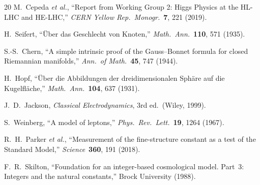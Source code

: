 \documentclass[11pt,a4paper]{article}
\begin{document}
\begin{thebibliography}{20}
M.~Cepeda \emph{et al.},
``Report from Working Group 2: Higgs Physics at the HL-LHC and HE-LHC,''
\emph{CERN Yellow Rep.\ Monogr.}\ \textbf{7}, 221 (2019).

H.~Seifert,
``\"Uber das Geschlecht von Knoten,''
\emph{Math.\ Ann.}\ \textbf{110}, 571 (1935).

S.-S.~Chern,
``A simple intrinsic proof of the Gauss--Bonnet formula for closed Riemannian manifolds,''
\emph{Ann.\ of Math.}\ \textbf{45}, 747 (1944).

H.~Hopf,
``\"Uber die Abbildungen der dreidimensionalen Sph\"are auf die Kugelfl\"ache,''
\emph{Math.\ Ann.}\ \textbf{104}, 637 (1931).

J.~D.~Jackson,
\emph{Classical Electrodynamics}, 3rd ed.\ (Wiley, 1999).

S.~Weinberg,
``A model of leptons,''
\emph{Phys.\ Rev.\ Lett.}\ \textbf{19}, 1264 (1967).

R.~H.~Parker \emph{et al.},
``Measurement of the fine-structure constant as a test of the Standard Model,''
\emph{Science}\ \textbf{360}, 191 (2018).

F.~R.~Skilton,
``Foundation for an integer-based cosmological model.
Part~3: Integers and the natural constants,''
Brock University (1988).

\end{thebibliography}
\end{document}

